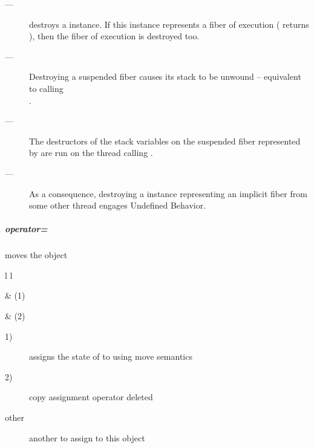 
\effects
\begin{description}
    \item[---] destroys a \fiber instance. If this instance represents a fiber
              of execution ( returns ), then the fiber of
              execution is destroyed too.
\end{description}

\remarks
\begin{description}
    \item[---] Destroying a suspended fiber causes its stack to be unwound --
               equivalent to calling\\
               .
    \item[---] The destructors of the stack variables on the suspended fiber
               represented by 
               are run on the thread calling \dtor.
    \item[---] As a consequence, destroying a \fiber instance
               representing an implicit fiber from some other
               thread engages Undefined Behavior.
\end{description}

\subparagraph*{operator=}
moves the \fiber object

\begin{tabular}{ l l }
    \midrule

     & (1)\\

    \midrule

     & (2)\\

    \midrule
\end{tabular}

\effects
\begin{description}
    \item[1)] assigns the state of  to  using move semantics
    \item[2)] copy assignment operator deleted
\end{description}

\params
\begin{description}
    \item[other]   another \fiber to assign to this object
\end{description}

